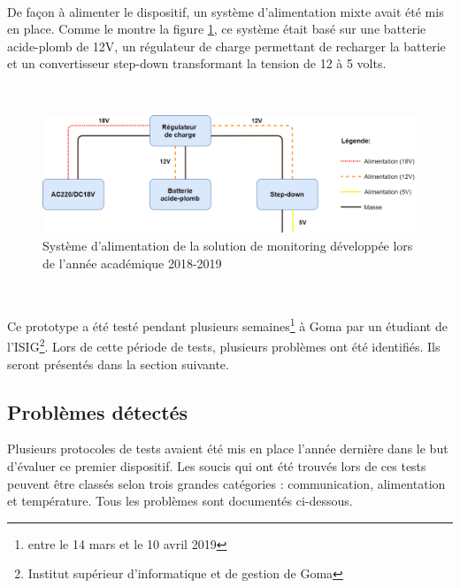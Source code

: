 ~

\noindent
De façon à alimenter le dispositif, un système d'alimentation mixte avait été mis en place. Comme le montre la figure \ref{fig:power_source}, ce système était basé sur une batterie acide-plomb de 12V, un régulateur de charge permettant de recharger la batterie et un convertisseur step-down transformant la tension de 12 à 5 volts.

~

\begin{figure}[ht!]
  \includegraphics[width=\textwidth]{img/el_prototype/power_source.png}
  \caption{Système d'alimentation de la solution de monitoring développée lors de l'année académique 2018-2019}
  \label{fig:power_source}
\end{figure}

~

\noindent
Ce prototype a été testé pendant plusieurs semaines\footnote{entre le 14 mars et le 10 avril 2019} à Goma par un étudiant de l'ISIG\footnote{Institut supérieur d'informatique et de gestion de Goma}. Lors de cette période de tests, plusieurs problèmes ont été identifiés. Ils seront présentés dans la section suivante.

\subsection{Problèmes détectés}

Plusieurs protocoles de tests avaient été mis en place l'année dernière dans le but d'évaluer ce premier dispositif. Les soucis qui ont été trouvés lors de ces tests peuvent être classés selon trois grandes catégories : communication, alimentation et température. Tous les problèmes sont documentés ci-dessous.

